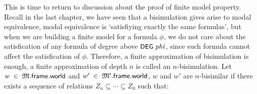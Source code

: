 \documentclass[letterpaper]{article}
\renewcommand{\HOLConst}[1]{{\textsf{\upshape\small #1}}}
\renewcommand{\HOLinline}[1]{\ensuremath{#1}}
\begin{document}
This is time to return to discussion about the proof of finite model property. Recall in the last chapter, we have seen that a bisimulation gives arise to modal equivalence, modal equivalence is `satisfiying exactly the same formulas', but when we are building a finite model for a formula $\phi$, we do not care about the satisfication of any formula of degree above \HOLinline{\HOLConst{DEG}\;\HOLFreeVar{phi}}, since such formula cannot affect the satisfication of $\phi$. Therefore, a finite approximation of bisimulation is enough, a finite approximation of depth $n$ is called an $n$-bisimulation. Let \HOLinline{\HOLFreeVar{w}\;\HOLSymConst{\HOLTokenIn{}}\;\HOLFreeVar{\ensuremath{\mathfrak{M}}}.\HOLFieldName{frame}.\HOLFieldName{world}} and \HOLinline{\HOLFreeVar{w\sp{\prime}}\;\HOLSymConst{\HOLTokenIn{}}\;\HOLFreeVar{\ensuremath{\mathfrak{M}'}}.\HOLFieldName{frame}.\HOLFieldName{world}}, $w$ and $w'$ are $n$-bisimilar if there exists a sequence of relations $Z_n\subseteq \cdots\subseteq Z_0$ such that:
\end{document}
